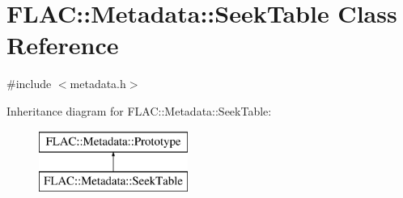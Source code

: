 \hypertarget{class_f_l_a_c_1_1_metadata_1_1_seek_table}{}\section{F\+L\+AC\+:\+:Metadata\+:\+:Seek\+Table Class Reference}
\label{class_f_l_a_c_1_1_metadata_1_1_seek_table}


{\ttfamily \#include $<$metadata.\+h$>$}

Inheritance diagram for F\+L\+AC\+:\+:Metadata\+:\+:Seek\+Table\+:\begin{figure}[H]
\begin{center}
\leavevmode
\includegraphics[height=2.000000cm]{class_f_l_a_c_1_1_metadata_1_1_seek_table}
\end{center}
\end{figure}

